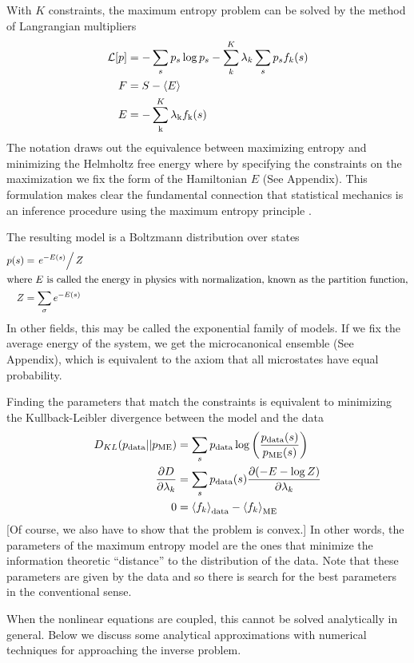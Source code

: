 \documentclass[aps,prl,twocolumn]{revtex4-1}
\begin{document}
With $K$ constraints, the maximum entropy problem can be solved by the method of Langrangian multipliers
\begin{align}
	\mathcal{L}[p] &= -\sum_s p_s\log p_s - \sum_k^K \lambda_k \sum_s p_s f_k(s)\label{eq:L}\\
	F &= S - \left<E\right>\\
	E &= -\sum_{\rm k}^K\lambda_{\rm k}f_{\rm k}(s)
\end{align}
The notation draws out the equivalence between maximizing entropy and minimizing the Helmholtz free energy where by specifying the constraints on the maximization we fix the form of the Hamiltonian $E$ (See Appendix). This formulation makes clear the fundamental connection that statistical mechanics is an inference procedure using the maximum entropy principle \cite{Jaynes:1957fy}.

The resulting model is a Boltzmann distribution over states
\begin{align}
	p(s) &= \left.e^{-E(s)}\right/Z\\
\intertext{where $E$ is called the energy in physics with normalization, known as the partition function,}
	Z &= \sum_\sigma e^{-E(s)}
\end{align}
In other fields, this may be called the exponential family of models. If we fix the average energy of the system, we get the microcanonical ensemble (See Appendix), which is equivalent to the axiom that all microstates have equal probability.

Finding the parameters that match the constraints is equivalent to minimizing the Kullback-Leibler divergence between the model and the data \cite{Cover:2006tl}
\begin{align}
	D_{KL}(p_{\rm data}||p_{\rm ME}) &= \sum_s p_{\rm data} \log\left(\frac{p_{\rm data}(s)}{p_{\rm ME}(s)}\right)\\
	\frac{\partial D}{\partial \lambda_k} &= \sum_s p_{\rm data}(s) \frac{\partial (-E-\log Z)}{\partial \lambda_k}\label{eq:dkl deriv}\\
	0 &= \left<f_k\right>_{\rm data} -\left<f_k\right>_{\rm ME}\label{eq:fk-fk}
\end{align}
[Of course, we also have to show that the problem is convex.] In other words, the parameters of the maximum entropy model are the ones that minimize the information theoretic ``distance'' to the distribution of the data. Note that these parameters are given by the data and so there is search for the best parameters in the conventional sense.

When the nonlinear equations are coupled, this cannot be solved analytically in general. Below we discuss some analytical approximations with numerical techniques for approaching the inverse problem.
\end{document}
